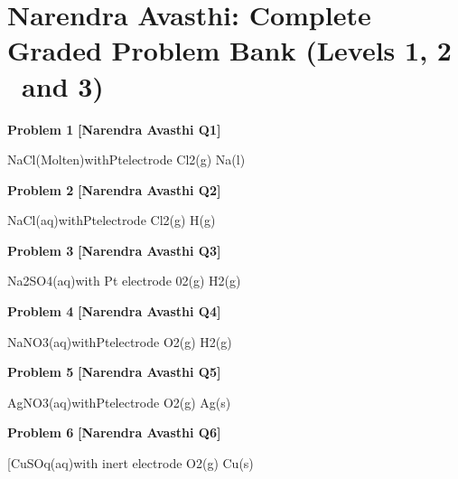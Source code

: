 \chapter{Narendra Avasthi: Complete Graded Problem Bank (Levels 1, 2 \ and  3)}
\label{chap:narendra_avasthi_all_questions}

\begin{problembox}
\textbf{Problem 1} \hfill \textbf{[Narendra Avasthi Q1]}
\label{q:ext-narendra_avasthi_all_questions-1}

NaCl(Molten)withPtelectrode
Cl2(g)
Na(l)
\end{problembox}

\begin{problembox}
\textbf{Problem 2} \hfill \textbf{[Narendra Avasthi Q2]}
\label{q:ext-narendra_avasthi_all_questions-2}

NaCl(aq)withPtelectrode
Cl2(g)
H(g)
\end{problembox}

\begin{problembox}
\textbf{Problem 3} \hfill \textbf{[Narendra Avasthi Q3]}
\label{q:ext-narendra_avasthi_all_questions-3}

Na2SO4(aq)with Pt electrode
02(g)
H2(g)
\end{problembox}

\begin{problembox}
\textbf{Problem 4} \hfill \textbf{[Narendra Avasthi Q4]}
\label{q:ext-narendra_avasthi_all_questions-4}

NaNO3(aq)withPtelectrode
O2(g)
H2(g)
\end{problembox}

\begin{problembox}
\textbf{Problem 5} \hfill \textbf{[Narendra Avasthi Q5]}
\label{q:ext-narendra_avasthi_all_questions-5}

AgNO3(aq)withPtelectrode
O2(g)
Ag(s)
\end{problembox}

\begin{problembox}
\textbf{Problem 6} \hfill \textbf{[Narendra Avasthi Q6]}
\label{q:ext-narendra_avasthi_all_questions-6}

[CuSOq(aq)with inert electrode
O2(g)
Cu(s)
\end{problembox}

